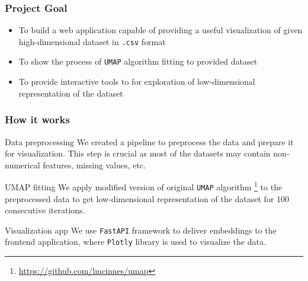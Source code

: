 \documentclass[aspectratio=169]{beamer}
\begin{document}
\begin{frame}
	\frametitle{Project Goal}
	\begin{itemize}
		\item To build a web application capable of providing
		      a useful visualization of given high-dimensional dataset
		      in \texttt{.csv} format
		\item To show the process of \texttt{UMAP} algorithm fitting
		      to provided dataset
		\item To provide interactive tools to for exploration of
		      low-dimensional representation of the dataset
	\end{itemize}

\end{frame}



\begin{frame}
	\frametitle{How it works}
	\begin{block}{Data preprocessing}
		We created a pipeline to preprocess the data
		and prepare it for visualization. This step is crucial
		as most of the datasets may contain non-numerical features,
		missing values, etc.
	\end{block}

	\begin{block}{UMAP fitting}
		We apply modified version of original \texttt{UMAP} algorithm
		\footnote{\url{https://github.com/lmcinnes/umap}}
		to the preprocessed data to get low-dimensional representation
		of the dataset for 100 consecutive iterations.
	\end{block}

	\begin{block}{Visualization app}
		We use \texttt{FastAPI} framework to deliver embeddings to the
		frontend application, where \texttt{Plotly} library is used to
		visualize the data.
	\end{block}
\end{frame}
\end{document}
